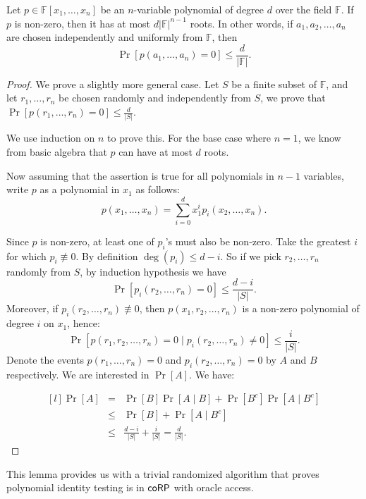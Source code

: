 \begin{lemma} 
Let $p \in \mathbb{F}[x_1, \ldots, x_n]$ be an $n$-variable polynomial of degree $d$ over the field $\mathbb{F}$. If $p$ is non-zero, then it has at most $d \vert \mathbb{F} \vert ^{n-1}$ roots. In other words, if $a_1, a_2, \ldots, a_n$ are chosen independently and uniformly from $\mathbb{F}$, then $$\Pr[ p(a_1, \ldots, a_n) = 0 ] \leq \frac{d}{\vert \mathbb{F} \vert}.$$
\end{lemma}
\begin{proof}
We prove a slightly more general case. Let $S$ be a finite subset of $\mathbb{F}$, and let $r_1, \ldots, r_n$ be chosen randomly and independently from $S$, we prove that 
$\Pr[p(r_1, \ldots, r_n) = 0] \leq \frac{d}{\vert S \vert}$.

We use induction on $n$ to prove this. For the base case where $n = 1$, we know from basic algebra that $p$ can have at most $d$ roots.

Now assuming that the assertion is true for all polynomials in $n-1$ variables, write $p$ as a polynomial in $x_1$ as follows:
$$p(x_1, \ldots, x_n) = \sum_{i=0}^d x_1^i p_i(x_2, \ldots, x_n).$$

Since $p$ is non-zero, at least one of $p_i$'s must also be non-zero. Take the greatest $i$ for which $p_i \not \equiv 0$. By definition $\deg(p_i) \leq d - i$. So if we pick $r_2, \ldots, r_n$ randomly from $S$, by induction hypothesis we have $$\Pr[p_i(r_2, \ldots, r_n) = 0] \leq \frac{d-i}{\vert S \vert}.$$
Moreover, if $p_i(r_2, \ldots, r_n) \not \equiv 0$, then $p(x_1, r_2, \ldots, r_n)$ is a non-zero polynomial of degree $i$ on $x_1$, hence:
$$\Pr[p(r_1, r_2, \ldots, r_n) = 0 \mid p_i(r_2, \ldots, r_n) \neq 0] \leq \frac{i}{\vert S \vert}.$$
Denote the events $p(r_1, \ldots, r_n) = 0$ and $p_i (r_2, \ldots, r_n) = 0$ by $A$ and $B$ respectively. We are interested in $\Pr[A]$. We have:

$$
\begin{matrix*}[l]
\Pr[A] & = & \Pr[B] \Pr[A \mid B] + \Pr[B^c] \Pr[A \mid B^c] \\ 
 & \leq & \Pr[B] + \Pr[A \mid B^c]  \\ 
 & \leq & \frac{d - i}{\vert S \vert} + \frac{i}{\vert S \vert} = \frac{d}{\vert S \vert}.
\end{matrix*}
$$

\end{proof}

This lemma provides us with a trivial randomized algorithm that proves polynomial identity testing is in $\mathsf{coRP}$ with oracle access. 

